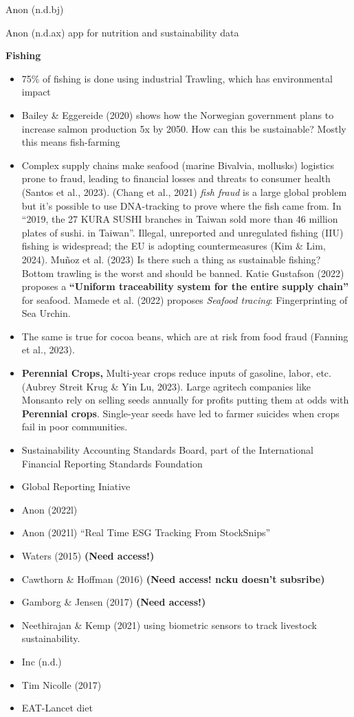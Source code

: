 \documentclass[
  letterpaper,
  DIV=11,
  numbers=noendperiod]{scrartcl}
\begin{document}
Anon (n.d.bj)

Anon (n.d.ax) app for nutrition and sustainability data

\textbf{Fishing}

\begin{itemize}
\item
  75\% of fishing is done using industrial Trawling, which has
  environmental impact
\item
  Bailey \& Eggereide (2020) shows how the Norwegian government plans to
  increase salmon production 5x by 2050. How can this be sustainable?
  Mostly this means fish-farming
\item
  Complex supply chains make seafood (marine Bivalvia, mollusks)
  logistics prone to fraud, leading to financial losses and threats to
  consumer health (Santos et al., 2023). (Chang et al., 2021) \emph{fish
  fraud} is a large global problem but it's possible to use DNA-tracking
  to prove where the fish came from. In ``2019, the 27 KURA SUSHI
  branches in Taiwan sold more than 46 million plates of sushi. in
  Taiwan''. Illegal, unreported and unregulated fishing (IIU) fishing is
  widespread; the EU is adopting countermeasures (Kim \& Lim, 2024).
  Muñoz et al. (2023) Is there such a thing as sustainable fishing?
  Bottom trawling is the worst and should be banned. Katie Gustafson
  (2022) proposes a \textbf{``Uniform traceability system for the entire
  supply chain''} for seafood. Mamede et al. (2022) proposes
  \emph{Seafood tracing}: Fingerprinting of Sea Urchin.
\item
  The same is true for cocoa beans, which are at risk from food fraud
  (Fanning et al., 2023).
\item
  \textbf{Perennial Crops,} Multi-year crops reduce inputs of gasoline,
  labor, etc. (Aubrey Streit Krug \& Yin Lu, 2023). Large agritech
  companies like Monsanto rely on selling seeds annually for profits
  putting them at odds with \textbf{Perennial crops}. Single-year seeds
  have led to farmer suicides when crops fail in poor communities.
\item
  Sustainability Accounting Standards Board, part of the International
  Financial Reporting Standards Foundation
\item
  Global Reporting Iniative
\item
  Anon (2022l)
\item
  Anon (2021l) ``Real Time ESG Tracking From StockSnips''
\item
  Waters (2015) \textbf{(Need access!)}
\item
  Cawthorn \& Hoffman (2016) \textbf{(Need access! ncku doesn't
  subsribe)}
\item
  Gamborg \& Jensen (2017) \textbf{(Need access!)}
\item
  Neethirajan \& Kemp (2021) using biometric sensors to track livestock
  sustainability.
\item
  Inc (n.d.)
\item
  Tim Nicolle (2017)
\item
  EAT-Lancet diet
\end{itemize}
\end{document}
